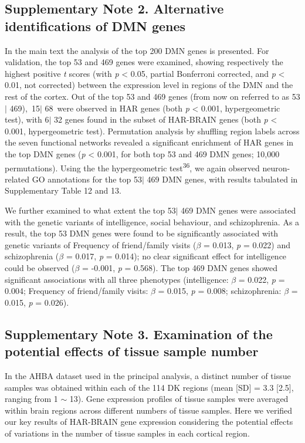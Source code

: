 \begin{refsection}
\subsection*{Supplementary Note 2. Alternative identifications of DMN genes}
In the main text the analysis of the top 200 DMN genes is presented. For validation, the top 53 and 469 genes were examined, showing respectively the highest positive \textit{t} scores (with \textit{p} < 0.05, partial Bonferroni corrected, and \textit{p} < 0.01, not corrected) between the expression level in regions of the DMN and the rest of the cortex. Out of the top 53 and 469 genes (from now on referred to as 53$ \vert $ 469), 15$ \vert $ 68 were observed in HAR genes (both \textit{p} < 0.001, hypergeometric test), with 6$ \vert $ 32 genes found in the subset of HAR-BRAIN genes (both \textit{p} < 0.001, hypergeometric test). Permutation analysis by shuffling region labels across the seven functional networks revealed a significant enrichment of HAR genes in the top DMN genes (\textit{p} < 0.001, for both top 53 and 469 DMN genes; 10,000 permutations). Using the the hypergeometric test\textsuperscript{36}, we again observed neuron-related GO annotations for the top 53$ \vert $ 469 DMN genes, with results tabulated in Supplementary Table 12 and 13.

We further examined to what extent the top 53$ \vert $ 469 DMN genes were associated with the genetic variants of intelligence, social behaviour, and schizophrenia. As a result, the top 53 DMN genes were found to be significantly associated with genetic variants of Frequency of friend/family visits (\textit{$ \beta $  }= 0.013, \textit{p} = 0.022) and schizophrenia (\textit{$ \beta $  }= 0.017, \textit{p} = 0.014); no clear significant effect for intelligence could be observed (\textit{$ \beta $  }= -0.001, \textit{p} = 0.568). The top 469 DMN genes showed significant associations with all three phenotypes (intelligence: \textit{$ \beta $  }= 0.022, \textit{p} = 0.004; Frequency of friend/family visits: \textit{$ \beta $  }= 0.015, \textit{p} = 0.008; schizophrenia: \textit{$ \beta $  }= 0.015, \textit{p} = 0.026).

\subsection*{Supplementary Note 3. Examination of the potential effects of tissue sample number}
In the AHBA dataset used in the principal analysis, a distinct number of tissue samples was obtained within each of the 114 DK regions (mean [SD] = 3.3 [2.5], ranging from 1 $ \sim $  13). Gene expression profiles of tissue samples were averaged within brain regions across different numbers of tissue samples. Here we verified our key results of HAR-BRAIN gene expression considering the potential effects of variations in the number of tissue samples in each cortical region.


\end{refsection}
